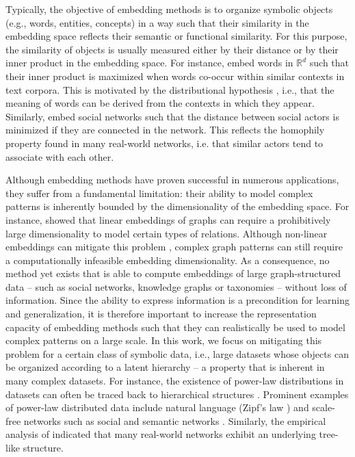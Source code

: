 \documentclass[11pt]{article}
\newcommand{\R}{\mathbb{R}}
\begin{document}
Typically, the objective of embedding methods is to organize symbolic objects
(e.g., words, entities, concepts) in a way such that their similarity in the
embedding space reflects their semantic or functional similarity. For this
purpose, the similarity of objects is usually measured either by their distance
or by their inner product in the embedding space. For instance,
\citet{DBLP:journals/corr/MikolovSCCD13} embed words in \(\R^d\) such that their
inner product is maximized when words co-occur within similar contexts in text
corpora. This is motivated by the distributional hypothesis
\cite{harris1954distributional,firth1957synopsis}, i.e., that the meaning of words
can be derived from the contexts in which they appear. Similarly,
\citet{hoff2002latent} embed social networks such that the
distance between social actors is minimized if they are connected in the
network. This reflects the homophily property found in many real-world
networks, i.e. that similar actors tend to associate with each other.

Although embedding methods have proven successful in numerous applications, they
suffer from a fundamental limitation: their ability to model complex patterns is
inherently bounded by the dimensionality of the embedding space. For instance,
\citet{DBLP:conf/nips/NickelJT14} showed that linear embeddings of graphs can
require a prohibitively large dimensionality to model certain types of
relations. Although non-linear embeddings can mitigate this problem
\cite{bouchard2015approximate}, complex graph patterns can still
require a computationally infeasible embedding dimensionality. As a consequence, no
method yet exists that is able to compute embeddings of large graph-structured
data -- such as social networks, knowledge graphs or taxonomies -- without loss of
information. Since the ability to express information is a precondition for
learning and generalization, it is therefore important to increase the
representation capacity of embedding methods such that they can realistically be
used to model complex patterns on a large scale.
In this work, we focus on mitigating this problem for
a certain class of symbolic data, i.e., large datasets whose objects can be
organized according to a latent hierarchy -- a property that is inherent in
many complex datasets. For instance, the existence of power-law distributions in
datasets can often be traced back to hierarchical structures
\cite{ravasz2003hierarchical}. Prominent examples of power-law distributed data
include natural language (Zipf's law \cite{DBLP:books/aw/Zipf49}) and scale-free
networks such as social and semantic networks \cite{steyvers2005large}. Similarly,
the empirical analysis of \citet{adcock2013tree} indicated that many real-world
networks exhibit an underlying tree-like structure.
\end{document}
